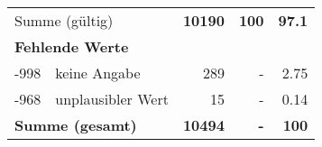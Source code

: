 \begin{longtable}{lXrrr}
     \midrule
     \multicolumn{2}{l}{Summe (gültig)} &
       \textbf{\num{10190}} &
     \textbf{100} &
       \textbf{\num[round-mode=places,round-precision=2]{97,1}} \\
     \multicolumn{5}{l}{\textbf{Fehlende Werte}}\\
       -998 &
       keine Angabe &
         \num{289} &
        - &
         \num[round-mode=places,round-precision=2]{2,75} \\
       -968 &
       unplausibler Wert &
         \num{15} &
        - &
         \num[round-mode=places,round-precision=2]{0,14} \\
     \midrule
     \multicolumn{2}{l}{\textbf{Summe (gesamt)}} &
          \textbf{\num{10494}} &
        \textbf{-} &
        \textbf{100} \\
     \bottomrule
     \end{longtable}
     
